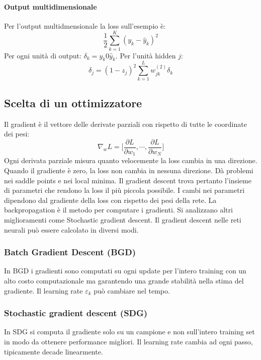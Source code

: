 			\paragraph{Output multidimensionale}
			Per l'output multidmensionale la loss sull'esempio \`e:
			$$\frac{1}{2}\sum\limits_{k = 1}^K(y_k-\hat{y}_k)^2$$
			Per ogni unit\`a di output: $\delta_k = y_k 0 \hat{y}_k$.
			Per l'unit\`a hidden $j$:
			$$\delta_j = (1-z_j)^2\sum\limits_{k=1}^Lw_{jk}^{(2)}\delta_k$$








	\subsection{Scelta di un ottimizzatore}
	Il gradient \`e il vettore delle derivate parziali con rispetto di tutte le coordinate dei pesi:
	$$\nabla_w L = \bigl[\frac{\partial L}{\partial w_1}, \cdots, \frac{\partial L}{\partial w_N}\bigr]$$
	Ogni derivata parziale misura quanto velocemente la loss cambia in una direzione.
	Quando il gradiente \`e zero, la loss non cambia in nessuna direzione.
	D\`a problemi nei saddle points e nei local minima.
	Il gradient descent trova pertanto l'insieme di parametri che rendono la loss il pi\`u piccola possibile.
	I cambi nei parametri dipendono dal gradiente della loss con rispetto dei pesi della rete.
	La backpropagation \`e il metodo per computare i gradienti.
	Si analizzano altri miglioramenti come Stochastic gradient descent.
	Il gradient descent nelle reti neurali pu\`o essere calcolato in diversi modi.

		\subsubsection{Batch Gradient Descent (BGD)}
		In BGD i gradienti sono computati su ogni update per l'intero training con un alto costo computazionale ma garantendo una grande stabilit\`a nella stima del gradiente.
		Il learning rate $\varepsilon_k$ pu\`o cambiare nel tempo.\\
		

		\subsubsection{Stochastic gradient descent (SDG)}
		In SDG si computa il gradiente solo su un campione e non sull'intero training set in modo da ottenere performance migliori.
		Il learning rate cambia ad ogni passo, tipicamente decade linearmente.
		

